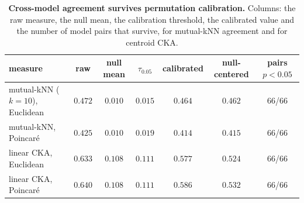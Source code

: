 \begin{table}[H]
\centering
\footnotesize
\setlength{\tabcolsep}{3pt}
\begin{tabular}{lcccccc}
\toprule
measure & raw & null mean & $\tau_{0.05}$ & calibrated & null-centered & pairs $p<0.05$ \\
\midrule
mutual-kNN ($k{=}10$), Euclidean & $0.472$ & $0.010$ & $0.015$ & $0.464$ & $0.462$ & 66/66 \\
mutual-kNN, Poincar\'e & $0.425$ & $0.010$ & $0.019$ & $0.414$ & $0.415$ & 66/66 \\
linear CKA, Euclidean & $0.633$ & $0.108$ & $0.111$ & $0.577$ & $0.524$ & 66/66 \\
linear CKA, Poincar\'e & $0.640$ & $0.108$ & $0.111$ & $0.586$ & $0.532$ & 66/66 \\
\bottomrule
\end{tabular}
\par\vspace{2pt}
\caption{\textbf{Cross-model agreement survives permutation calibration.} Columns: the raw measure, the null mean, the calibration threshold, the calibrated value and the number of model pairs that survive, for mutual-kNN agreement and for centroid CKA.
}
\label{tab:q13-local}
\end{table}
